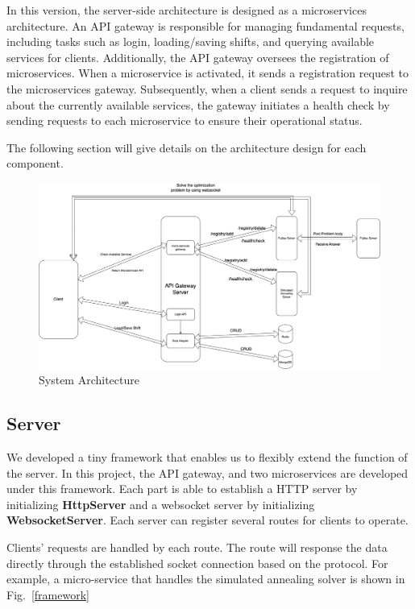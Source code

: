 \documentclass[11pt, oneside]{article}   	%
\begin{document}
In this version, the server-side architecture is designed as a microservices architecture. An API gateway is responsible for managing fundamental requests, including tasks such as login, loading/saving shifts, and querying available services for clients. Additionally, the API gateway oversees the registration of microservices. When a microservice is activated, it sends a registration request to the microservices gateway. Subsequently, when a client sends a request to inquire about the currently available services, the gateway initiates a health check by sending requests to each microservice to ensure their operational status.

The following section will give details on the architecture design for each component.

\begin{figure}[h]
\centering
\includegraphics[width=\textwidth]{arch1}
\caption{System Architecture}
\label{sysarch}
\end{figure}

\subsection{Server}
We developed a tiny framework that enables us to flexibly extend the function of the server.  In this project, the API gateway, and two microservices are developed under this framework. Each part is able to establish a HTTP server by initializing \textbf{HttpServer} and a websocket server by initializing \textbf{WebsocketServer}. Each server can register several routes for clients to operate. 

Clients' requests are handled by each route. The route will response the data directly through the established socket connection based on the protocol.
For example, a micro-service that handles the simulated annealing solver is shown in Fig.~\ref{framework}
\end{document}
